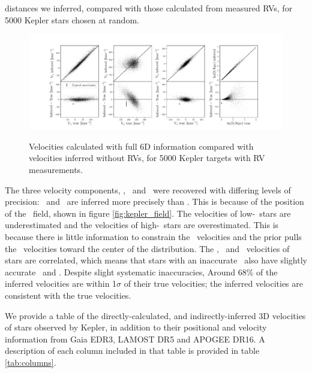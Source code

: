 distances we inferred, compared with those calculated from measured RVs, for
5000 Kepler stars chosen at random.
\begin{figure}[ht!]
\caption{Velocities calculated with full 6D information compared with
    velocities inferred without RVs, for 5000 Kepler targets with RV
    measurements.}
  \centering
    \includegraphics[width=1\textwidth]{residuals}
\label{fig:residuals}
\end{figure}
The three velocity components, \vx, \vy\ and \vz\ were recovered with
differing levels of precision: \vx\ and \vz\ are inferred more precisely than
\vy.
This is because of the position of the \kepler\ field, shown in figure
\ref{fig:kepler_field}.
The velocities of low-\vy\ stars are underestimated and the velocities of
high-\vy\ stars are overestimated.
This is because there is little information to constrain the \vy\ velocities
and the prior pulls the \vy\ velocities toward the center of the distribution.
The \vx, \vy\ and \vz\ velocities of stars are correlated, which means that
stars with an inaccurate \vy\ also have slightly accurate \vz\ and \vx.
Despite slight systematic inaccuracies, Around 68\% of the inferred velocities
are within 1$\sigma$ of their true velocities; the inferred velocities are
consistent with the true velocities.

We provide a table of the directly-calculated, and indirectly-inferred 3D
velocities of stars observed by Kepler, in addition to their positional and
velocity information from Gaia EDR3, LAMOST DR5 and APOGEE DR16.
A description of each column included in that table is provided in table
\ref{tab:columns}.

